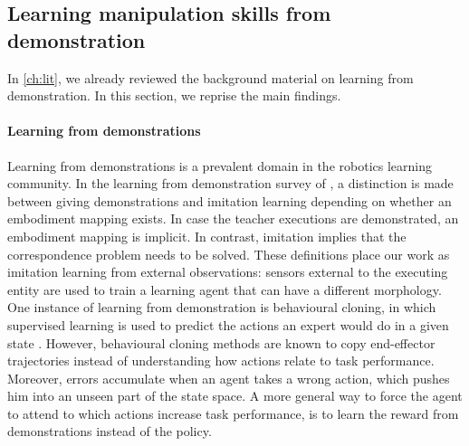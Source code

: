 \documentclass[\home/main.tex]{subfiles}
\begin{document}
\subsection{Learning manipulation skills from demonstration}

In \cref{ch:lit}, we already reviewed the background material on learning from demonstration. In this section, we reprise the main findings.

\paragraph{Learning from demonstrations}
Learning from demonstrations is a prevalent domain in the robotics learning community. In the learning from demonstration survey of \autocite{Argall2009}, a distinction is made between giving demonstrations and imitation learning depending on whether an embodiment mapping exists. In case the teacher executions are demonstrated, an embodiment mapping is implicit. In contrast, imitation implies that the correspondence problem needs to be solved. These definitions place our work as imitation learning from external observations: sensors external to the executing entity are used to train a learning agent that can have a different morphology. One instance of learning from demonstration is behavioural cloning, in which supervised learning is used to predict the actions an expert would do in a given state \autocite{Ross2011}. However, behavioural cloning methods are known to copy end-effector trajectories instead of understanding how actions relate to task performance. Moreover, errors accumulate when an agent takes a wrong action, which pushes him into an unseen part of the state space. A more general way to force the agent to attend to which actions increase task performance, is to learn the reward from demonstrations instead of the policy.
\end{document}
